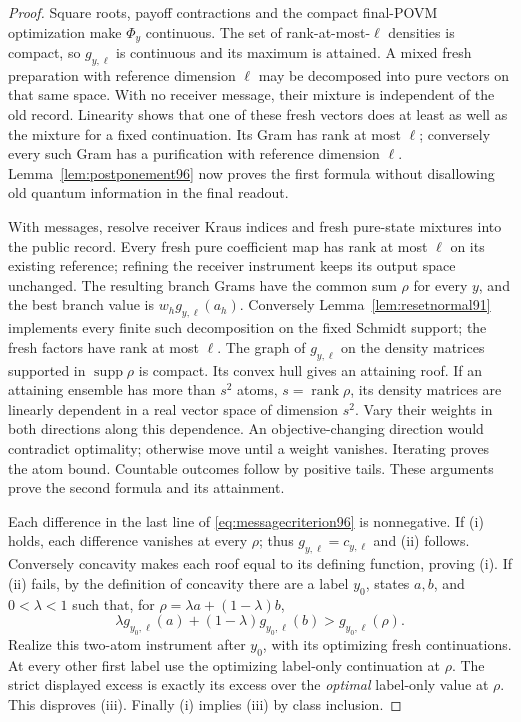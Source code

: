 \begin{proof}
Square roots, payoff contractions and the compact final-POVM
optimization make $\Phi_y$ continuous.  The set of rank-at-most-$\ell$
densities is compact, so $g_{y,\ell}$ is continuous and its maximum is
attained.  A mixed fresh preparation with reference dimension $\ell$
may be decomposed into pure vectors on that same space.  With no
receiver message, their mixture is independent of the old record.
Linearity shows that one of these fresh vectors does at least as well
as the mixture for a fixed continuation.  Its Gram has rank at most
$\ell$; conversely every such Gram has a purification with reference
dimension $\ell$.  Lemma~\ref{lem:postponement96} now proves the first
formula without disallowing old quantum information in the final
readout.

With messages, resolve receiver Kraus indices and fresh pure-state
mixtures into the public record.  Every fresh pure coefficient map has
rank at most $\ell$ on its existing reference; refining the receiver
instrument keeps its output space unchanged.  The resulting branch
Grams have the common sum $\rho$ for every $y$, and the best branch
value is $w_hg_{y,\ell}(a_h)$.  Conversely
Lemma~\ref{lem:resetnormal91} implements every finite such decomposition
on the fixed Schmidt support; the fresh factors have rank at most
$\ell$.  The graph of $g_{y,\ell}$ on the density matrices supported
in $\operatorname{supp}\rho$ is compact.  Its convex hull gives an
attaining roof.  If an attaining ensemble has more than
$s^2$ atoms, $s=\operatorname{rank}\rho$, its density matrices are
linearly dependent in a real vector space of dimension $s^2$.
Vary their weights in both directions along this dependence.  An
objective-changing direction would contradict optimality; otherwise
move until a weight vanishes.  Iterating proves the atom bound.
Countable outcomes follow by positive tails.  These arguments prove
the second formula and its attainment.

Each difference in the last line of \eqref{eq:messagecriterion96} is
nonnegative.  If (i) holds, each difference vanishes at every $\rho$;
thus $g_{y,\ell}=c_{y,\ell}$ and (ii) follows.  Conversely concavity
makes each roof equal to its defining function, proving (i).
If (ii) fails, by the definition of concavity there are a label $y_0$,
states $a,b$, and $0<\lambda<1$ such that, for
$\rho=\lambda a+(1-\lambda)b$,
\[
 \lambda g_{y_0,\ell}(a)+(1-\lambda)g_{y_0,\ell}(b)
                                      >g_{y_0,\ell}(\rho).
\]
Realize this two-atom instrument after $y_0$, with its optimizing fresh
continuations.  At every other first label use the optimizing
label-only continuation at $\rho$.  The strict displayed excess is
exactly its excess over the \emph{optimal} label-only value at $\rho$.
This disproves (iii).  Finally (i) implies (iii) by class inclusion.
\end{proof}
